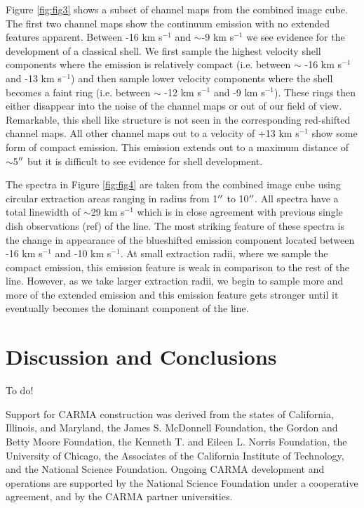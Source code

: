 \documentclass[manuscript]{aastex}
\begin{document}
Figure \ref{fig:fig3} shows a subset of channel maps from the combined image cube. The first two channel maps show the continuum emission with no extended features apparent. Between -16 km s${}^{-1}$ and $\sim$-9 km s${}^{-1}$ we see evidence for the development of a classical shell. We first sample the highest velocity shell components where the emission is relatively compact (i.e. between $\sim$ -16 km s${}^{-1}$ and -13 km s${}^{-1}$) and then sample lower velocity components where the shell becomes a faint ring (i.e. between $\sim$ -12 km s${}^{-1}$ and -9 km s${}^{-1}$). These rings then either disappear into the noise of the channel maps or out of our field of view. Remarkable, this shell like structure is not seen in the corresponding red-shifted channel maps. All other channel maps out to a velocity of +13 km s${}^{-1}$ show some form of compact emission. This emission extends out to a maximum distance of $\sim$5$\mbox{$^{\prime\prime}$}$ but it is difficult to see evidence for shell development. 

The spectra in Figure \ref{fig:fig4} are taken from the combined image cube using circular extraction areas ranging in radius from 1$\mbox{$^{\prime\prime}$}$ to 10$\mbox{$^{\prime\prime}$}$. All spectra have a total linewidth of $\sim$29 km s${}^{-1}$ which is in close agreement with previous single dish observations (ref) of the line. The most striking feature of these spectra is the change in appearance of the blueshifted emission component located between -16 km s${}^{-1}$ and -10 km s${}^{-1}$.  At small extraction radii, where we sample the compact emission, this emission feature is weak in comparison to the rest of the line. However, as we take larger extraction radii, we begin to sample more and more of the extended emission and this emission feature gets stronger until it eventually becomes the dominant component of the line. 

\section{Discussion and Conclusions}

To do!

\acknowledgments

Support for CARMA construction was derived from the states of California, Illinois, and
Maryland, the James S. McDonnell Foundation, the Gordon and Betty Moore Foundation, the
Kenneth T. and Eileen L. Norris Foundation, the University of Chicago, the Associates of the
California Institute of Technology, and the National Science Foundation. Ongoing CARMA
development and operations are supported by the National Science Foundation under a
cooperative agreement, and by the CARMA partner universities.
\end{document}
